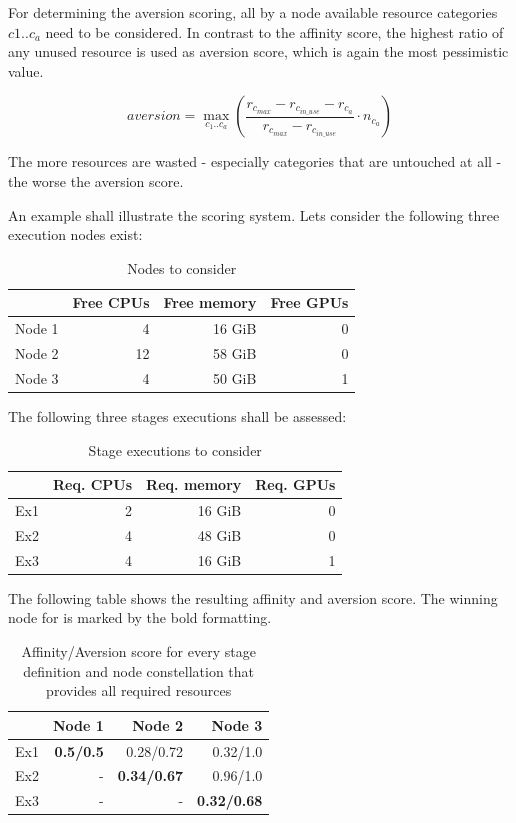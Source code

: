 For determining the aversion scoring, all by a node available resource categories $c1 .. c_a$ need to be considered.
In contrast to the affinity score, the highest ratio of any unused resource is used as aversion score, which is again the most pessimistic value.

\begin{equation}
	\label{election:eq:aversion}
	{aversion} = \max_{c_1 .. c_a} \left( \frac{r_{c_{max}} - r_{c_{in\_use}} - r_{c_a}}{r_{c_{max}}  - r_{c_{in\_use}}} \cdot n_{c_a} \right)
\end{equation}

The more resources are wasted - especially categories that are untouched at all - the worse the aversion score.

An example shall illustrate the scoring system.
Lets consider the following three execution nodes exist:

\begin{table}[H]
	\centering
	\begin{tabular}{l|r|r|r}
		 & Free CPUs & Free memory & Free GPUs \\
		 \hline
		 Node 1 & 4  	& 16 GiB & 0 \\
		 Node 2 & 12 	& 58 GiB & 0 \\
		 Node 3 & 4 	& 50 GiB & 1 \\
	\end{tabular}
	\caption{Nodes to consider}
\end{table}

The following three stages executions shall be assessed:

\begin{table}[H]
	\centering
	\begin{tabular}{l|r|r|r}
		& Req. CPUs & Req. memory & Req. GPUs \\
		\hline
		Ex1 & 2 & 16 GiB & 0 \\
		Ex2 & 4 & 48 GiB & 0 \\
		Ex3 & 4 & 16 GiB & 1 \\
	\end{tabular}
	\caption{Stage executions to consider}
\end{table}

The following table shows the resulting affinity and aversion score.
The winning node for is marked by the bold formatting.


\begin{table}[H]
	\centering
	\begin{tabular}{l|r|r|r}
		& Node 1 & Node 2 & Node 3 \\
		\hline
		Ex1 & \textbf{0.5/0.5}	& 		  0.28/0.72	& 		  0.32/1.0 \\
		Ex2 & - 				& \textbf{0.34/0.67}& 		  0.96/1.0 \\
		Ex3 & - 				& - 				& \textbf{0.32/0.68} \\
	\end{tabular}
	\caption{Affinity/Aversion score for every stage definition and node constellation that provides all required resources}
\end{table}

